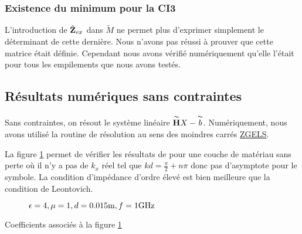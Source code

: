 \subsubsection{Existence du minimum pour la CI3}

  L'introduction de \(\hat{\mathbf{Z}}_{ex}\) dans \(\tilde M\) ne permet plus d'exprimer simplement le déterminant de cette dernière. Nous n'avons pas réussi à prouver que cette matrice était définie. Cependant nous avons vérifié numériquement qu'elle l'était pour tous les empilements que nous avons testés.


  \subsection{Résultats numériques sans contraintes}

      Sans contraintes, on résout le système linéaire \(\overset{\thicksim}{\mathbf{H}} X - \overset{\thicksim}{b}\). Numériquement, nous avons utilisé la routine de résolution au sens des moindres carrés \href{http://www.netlib.org/lapack/explore-html/d6/d10/group__complex16_g_esolve_ga1d8089ba1e1538eb3d1ab0ebe97596c7.html}{ZGELS}.

      La figure \ref{fig:imp_fourier:plan:hoppe:33:hoibc} permet de vérifier les résultats de \cite[p.~33]{hoppe_impedance_1995} pour une couche de matériau sans perte où il n'y a pas de \(k_x\) réel tel que \(kd=\frac{\pi}{2} + n \pi\) donc pas d'asymptote pour le symbole. La condition d'impédance d'ordre élevé est bien meilleure que la condition de Leontovich.
      \begin{figure}[!hbt]
          \centering
          
          \caption[CIOE sur empilement de Hoppe & Rahmat-Samii p.~33]{\(\epsilon = 4, \mu = 1, d=0.015\text{m}, f=1\text{GHz}\)}
          \label{fig:imp_fourier:plan:hoppe:33:hoibc}
      \end{figure}
      \begin{table}[!hbt]
        \centering
        \caption{Coefficients associés à la figure \ref{fig:imp_fourier:plan:hoppe:33:hoibc}}
        \label{tab:imp_fourier:plan:hoppe:33:hoibc}
      \end{table}

